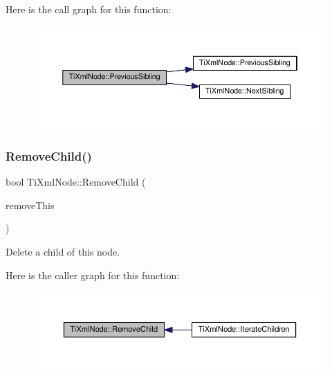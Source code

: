 Here is the call graph for this function\+:\nopagebreak
\begin{figure}[H]
\begin{center}
\leavevmode
\includegraphics[width=350pt]{class_ti_xml_node_a6c977049207177ef21b51972315c2053_cgraph}
\end{center}
\end{figure}
\mbox{\label{class_ti_xml_node_ae19d8510efc90596552f4feeac9a8fbf}} 
\subsubsection{\texorpdfstring{Remove\+Child()}{RemoveChild()}}
{\footnotesize\ttfamily bool Ti\+Xml\+Node\+::\+Remove\+Child (\begin{DoxyParamCaption}\item[{\hyperlink{class_ti_xml_node}{Ti\+Xml\+Node} $\ast$}]{remove\+This }\end{DoxyParamCaption})}



Delete a child of this node. 

Here is the caller graph for this function\+:\nopagebreak
\begin{figure}[H]
\begin{center}
\leavevmode
\includegraphics[width=350pt]{class_ti_xml_node_ae19d8510efc90596552f4feeac9a8fbf_icgraph}
\end{center}
\end{figure}
\mbox{\label{class_ti_xml_node_a543208c2c801c84a213529541e904b9f}} 
